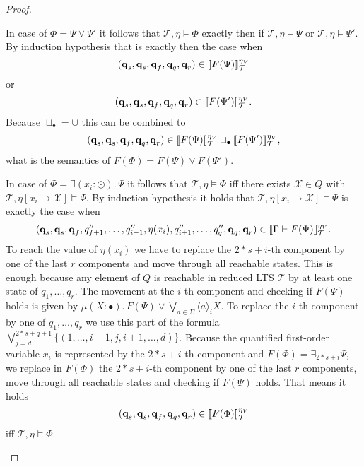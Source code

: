 \begin{proof}
\begin{compactitem}
        \item In case of $\Phi = \Psi \vee \Psi'$ it follows that $\mathcal{T}, \eta \models \Phi$ exactly then if
        $\mathcal{T}, \eta \models \Psi$ or $\mathcal{T}, \eta \models \Psi'$. By induction hypothesis that is
        exactly then the case when
        \[(\emph{q}_s, \emph{q}_s, \emph{q}_f, \emph{q}_q, \emph{q}_r) \in \llbracket F
        (\Psi) \rrbracket^{\eta_V}_\mathcal{T}\]
        or
        \[(\emph{q}_s, \emph{q}_s, \emph{q}_f, \emph{q}_q, \emph{q}_r) \in \llbracket F
        (\Psi') \rrbracket^{\eta_V}_\mathcal{T}.\]
        Because $\sqcup_{\bullet} = \cup$ this can be combined to
        \[(\emph{q}_s, \emph{q}_s, \emph{q}_f, \emph{q}_q, \emph{q}_r) \in \llbracket F
        (\Psi) \rrbracket^{\eta_V}_\mathcal{T} \sqcup_\bullet \llbracket F
        (\Psi') \rrbracket^{\eta_V}_\mathcal{T},\]
        what is the semantics of $F(\Phi) = F(\Psi) \vee F(\Psi')$.

        \item In case of $\Phi = \exists (x_i\colon \odot).\,\Psi$ it follows that $\mathcal{T}, \eta \models \Phi$ iff
        there exists  $\mathcal{X} \in Q$ with $\mathcal{T}, \eta[x_i \rightarrow \mathcal{X}] \models \Psi$. By induction hypothesis it holds that $\mathcal{T}, \eta[x_i
        \rightarrow \mathcal{X}] \models \Psi$ is exactly the case when
        \begin{align*}
            (\emph{q}_s, \emph{q}_s, \emph{q}_f, q_{f+1}'', \dots, q_{i-1}'', \eta(x_i), q_{i+1}'', \dots, q_{q}'', \emph{q}_q, \emph{q}_r) \in
            \llbracket \Gamma \vdash F(\Psi) \rrbracket^{\eta_V}_\mathcal{T}.
        \end{align*}
        To reach the value of $\eta(x_i)$ we have to replace the $2*s+i$-th component by one of 
        the last $r$ components and move through all reachable states. This is enough because 
        any element of $Q$ is reachable in reduced LTS $\mathcal{T}$ by at least one state of 
        $q_1, \dots, q_r$.  The movement at the $i$-th component and checking if $F(\Psi)$ 
        holds is given by $\mu (X \colon \bullet).\,F(\Psi) \vee \bigvee_{a \in \Sigma} \langle a 
        \rangle_{i} X$. To replace the $i$-th component by one of $q_1, \dots, q_r$ 
        we use this part of the formula $\bigvee_{j=d}^{2*s+q+1} \{(1, \dots, i-1, j, i + 1, \dots, d)\}$. Because the quantified first-order variable $x_i$ is represented by the $2*s+i$-th component and $F(\Phi) = \exists_{2*s+i} \Psi$, we replace in $F(\Phi)$ the $2*s+i$-th component by one of the last $r$ components, move through all reachable states and checking if $F(\Psi)$ holds. That means it holds 
        \[(\emph{q}_s, \emph{q}_s, \emph{q}_f, \emph{q}_q, \emph{q}_r) \in \llbracket F
        (\Phi) \rrbracket^{\eta_V}_\mathcal{T}\]
        iff $\mathcal{T}, \eta \models \Phi$.


\end{compactitem}
\end{proof}
